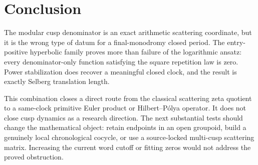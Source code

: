 \section{Conclusion}

The modular cusp denominator is an exact arithmetic scattering coordinate,
but it is the wrong type of datum for a final-monodromy closed period.  The
entry-positive hyperbolic family proves more than failure of the logarithmic
ansatz:
every denominator-only function satisfying the square repetition law is
zero.  Power stabilization does recover a meaningful closed clock, and the
result is exactly Selberg translation length.

This combination closes a direct route from the classical scattering zeta
quotient to a same-clock primitive Euler product or Hilbert--P\'olya operator.
It does not close cusp dynamics as a research direction.  The next substantial
tests should change the mathematical object: retain endpoints in an open
groupoid, build a genuinely local chronological cocycle, or use a source-locked
multi-cusp scattering matrix.  Increasing the current word cutoff or fitting
zeros would not address the proved obstruction.
